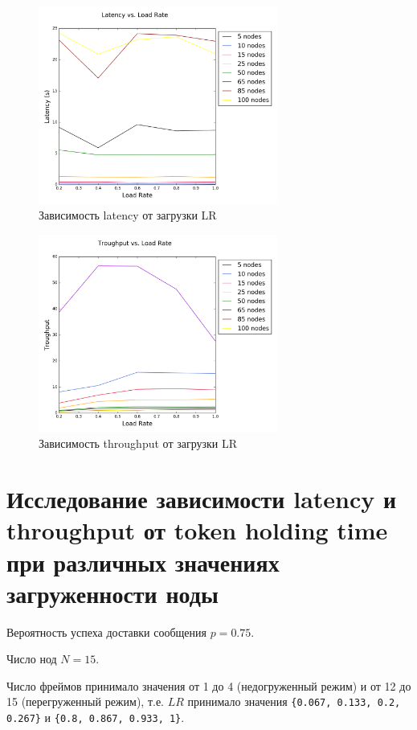 \documentclass{article}
\begin{document}
\begin{figure}[H]
\centering
\includegraphics[width=0.7\textwidth]{Plots/LLR.png}
\caption{Зависимость latency от загрузки LR}
\end{figure}

\begin{figure}[H]
\centering
\includegraphics[width=0.7\textwidth]{Plots/TLR.png}
\caption{Зависимость throughput от загрузки LR}
\end{figure}

\section{Исследование зависимости latency и throughput от token holding time при различных значениях загруженности ноды}

Вероятность успеха доставки сообщения $p=0.75$.

Число нод $N = 15$.

Число фреймов принимало значения от 1 до 4 (недогруженный режим) и от 12 до 15 (перегруженный режим), т.е. $LR$ принимало значения \lstinline|{0.067, 0.133, 0.2, 0.267}| и \lstinline|{0.8, 0.867, 0.933, 1}|.
\end{document}
